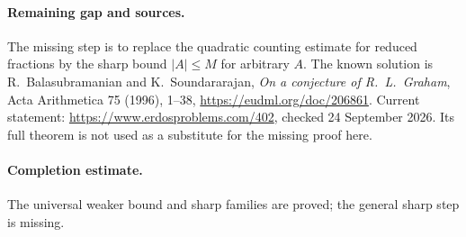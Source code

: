 \paragraph{Remaining gap and sources.}
The missing step is to replace the quadratic counting estimate for reduced
fractions by the sharp bound \(|A|\leq M\) for arbitrary \(A\).
The known solution is R.~Balasubramanian and K.~Soundararajan,
\emph{On a conjecture of R.~L.~Graham}, Acta Arithmetica 75 (1996),
1--38, \url{https://eudml.org/doc/206861}.
Current statement: \url{https://www.erdosproblems.com/402},
checked 24 September 2026. Its full theorem is not used as a substitute
for the missing proof here.

\paragraph{Completion estimate.}
The universal weaker bound and sharp families are proved; the general sharp step is missing.
